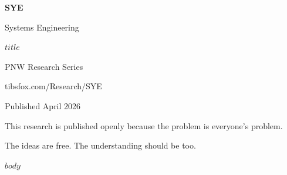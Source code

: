 \documentclass[11pt,a4paper]{article}
\begin{document}
\begin{titlepage}
\centering
\vspace*{3cm}
{\Huge\bfseries\sffamily\color{syeaccent} SYE\par}
\vspace{0.5cm}
{\LARGE\sffamily Systems Engineering\par}
\vspace{1cm}
{\Large\sffamily\color{syeeng} $title$\par}
\vspace{2cm}
{\large\sffamily PNW Research Series\par}
{\normalsize\sffamily tibsfox.com/Research/SYE\par}
\vspace{1cm}
{\normalsize\sffamily\color{syemuted} Published April 2026\par}
\vfill
{\small\sffamily\color{syemuted} This research is published openly because the problem is everyone's problem.\par
The ideas are free. The understanding should be too.\par}
\end{titlepage}

$body$
\end{document}
